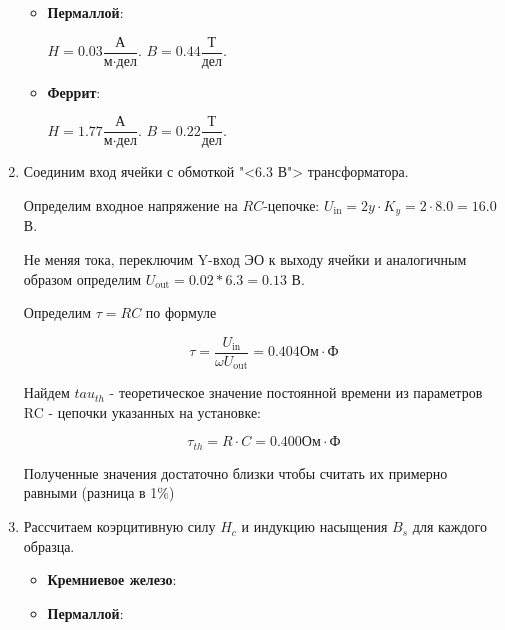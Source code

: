 \documentclass[12pt]{lab}
\begin{document}
\begin{enumerate}
\begin{itemize}
            \item  \textbf{Пермаллой}:

                $H=0.03 \dfrac{\text{А}}{\text{м} \cdot \text{дел}}.$
                $B=0.44 \dfrac{\text{Т}}{\text{дел}}.$

            \item  \textbf{Феррит}:

                $H=1.77 \dfrac{\text{А}}{\text{м} \cdot \text{дел}}.$
                $B=0.22 \dfrac{\text{Т}}{\text{дел}}.$

        \end{itemize}

    \item Соединим вход ячейки с обмоткой "<6.3 В"> трансформатора.

        Определим входное напряжение на $ RC $-цепочке:
        $U_\text{in}=2y\cdot K_{y} = 2 \cdot 8.0 = 16.0$ В.

        Не меняя тока, переключим Y-вход ЭО к выходу ячейки и
        аналогичным образом определим $U_\text{out} = 0.02 * 6.3 = 0.13$ В.

        Определим $\tau = RC $ по формуле

        $$\tau = \dfrac{U_\text{in}}{\omega U_\text{out}} = 0.404 \text{Ом} \cdot \text{Ф}$$

        Найдем $tau_{th}$ - теоретическое значение постоянной времени из параметров RC - цепочки указанных на установке:

        $$\tau_{th} = R \cdot C = 0.400 \text{Ом} \cdot \text{Ф}$$

        Полученные значения достаточно близки чтобы считать их примерно равными (разница в 1\%)

    \item Рассчитаем коэрцитивную силу $H_{c}$ и индукцию насыщения
        $B_{s}$ для каждого образца.

        \begin{itemize}
            \item   \textbf{Кремниевое железо}:


            \item  \textbf{Пермаллой}:



\end{itemize}
\end{enumerate}
\end{document}
